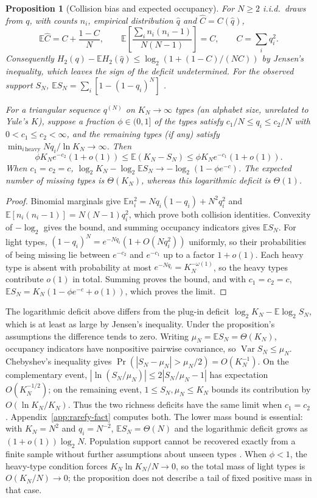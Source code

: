 \documentclass[10pt]{article}
\theoremstyle{plain}
\newtheorem{proposition}{Proposition}
\theoremstyle{definition}
\newcommand{\E}{\mathbb{E}}
\newcommand{\Var}{\operatorname{Var}}
\begin{document}
\begin{proposition}[Collision bias and expected occupancy]
\label{prop:rarefy}
For $N\ge2$ i.i.d.\ draws from $q$, with counts $n_i$, empirical distribution $\hat q$ and $\widehat C=C(\hat q)$,
\[
\E\hat C=C+\frac{1-C}{N},\qquad
\E\!\left[\frac{\sum_i n_i(n_i-1)}{N(N-1)}\right]=C,
\qquad C=\sum_i q_i^2.
\]
Consequently $H_2(q)-\E H_2(\hat q)\le\log_2(1+(1-C)/(NC))$ by Jensen's inequality, which leaves
the sign of the deficit undetermined. For the observed support $S_N$,
$\E S_N=\sum_i[1-(1-q_i)^N]$ \citep[Eq.~14]{hurlbert1971}.

For a triangular sequence $q^{(N)}$ on $K_N\to\infty$ types (an alphabet size, unrelated to
Yule's $K$), suppose a fraction $\phi\in(0,1]$ of the types satisfy $c_1/N\le q_i\le c_2/N$ with
$0<c_1\le c_2<\infty$, and the remaining types (if any) satisfy
$\min_{i\,\mathrm{heavy}}Nq_i/\ln K_N\to\infty$. Then
\[
\phi K_Ne^{-c_2}(1+o(1))\le\E(K_N-S_N)\le \phi K_Ne^{-c_1}(1+o(1)).
\]
When $c_1=c_2=c$, $\log_2 K_N-\log_2\E S_N\to-\log_2(1-\phi e^{-c})$. The expected number of missing types
is $\Theta(K_N)$, whereas this logarithmic deficit is $\Theta(1)$.
\end{proposition}
\begin{proof}
Binomial marginals give $\E n_i^2=Nq_i(1-q_i)+N^2q_i^2$ and
$\E[n_i(n_i-1)]=N(N-1)q_i^2$, which prove both collision identities.
Convexity of $-\log_2$ gives the bound, and summing occupancy indicators gives $\E S_N$.
For light types, $(1-q_i)^N=e^{-Nq_i}(1+O(Nq_i^2))$ uniformly, so their probabilities of being
missing lie between $e^{-c_2}$ and $e^{-c_1}$ up to a factor $1+o(1)$. Each heavy type is absent
with probability at most $e^{-Nq_i}=K_N^{-\omega(1)}$, so the heavy types contribute $o(1)$ in
total. Summing proves the bound, and with $c_1=c_2=c$,
$\E S_N=K_N(1-\phi e^{-c}+o(1))$, which proves the limit.
\end{proof}

The logarithmic deficit above differs from the plug-in deficit $\log_2 K_N-\E\log_2 S_N$, which
is at least as large by Jensen's inequality. Under the proposition's assumptions the difference tends to zero.
Writing $\mu_N=\E S_N=\Theta(K_N)$, occupancy indicators have nonpositive pairwise covariance, so $\Var
S_N\le\mu_N$. Chebyshev's inequality gives $\Pr(|S_N-\mu_N|>\mu_N/2)=O(K_N^{-1})$. On the complementary event,
$|\ln(S_N/\mu_N)|\le2|S_N/\mu_N-1|$ has expectation $O(K_N^{-1/2})$; on the remaining event, $1\le
S_N,\mu_N\le K_N$ bounds its contribution by $O(\ln K_N/K_N)$. Thus the two richness deficits have the same
limit when $c_1=c_2$. Appendix~\ref{app:rarefy-fact} computes both. The lower mass bound is essential: with $K_N=N^2$
and $q_i=N^{-2}$, $\E S_N=\Theta(N)$ and the logarithmic deficit grows as $(1+o(1))\log_2 N$.
Population support cannot be recovered exactly from a finite sample without further assumptions
about unseen types \citep{good1953,chao1984}. When $\phi<1$, the heavy-type condition forces
$K_N\ln K_N/N\to0$, so the total mass of light types is $O(K_N/N)\to0$; the proposition
does not describe a tail of fixed positive mass in that case.
\end{document}

